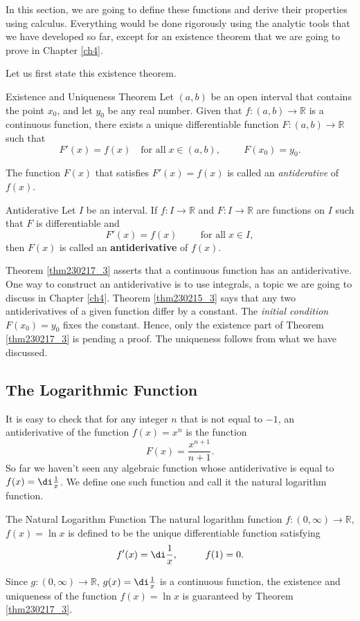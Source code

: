 In this section, we are going to define these functions  and derive their properties using calculus. Everything would be done rigorously using the analytic tools that we have developed so far, except for an existence theorem that we are going to prove in Chapter \ref{ch4}. 


Let us first state this existence theorem.
\begin{theorem}[label=thm230217_3]{Existence and Uniqueness Theorem}
Let $(a,b)$ be an open interval that contains the point $x_0$, and let $y_0$ be any real number.  Given that $f:(a,b)\to\mathbb{R}$ is a continuous function, there exists a unique differentiable function $F:(a,b)\to\mathbb{R}$ such that \[F'(x)=f(x)\quad \text{for all}\;x\in (a, b), \hspace{1cm}F(x_0)=y_0.\]
\end{theorem}
The function $F(x)$ that satisfies $F'(x)=f(x)$ is called an \emph{antiderative} of $f(x)$.
\begin{definition}{Antiderative}
Let $I$ be an interval. If $f:I\to\mathbb{R}$ and $F:I\to\mathbb{R}$ are functions on $I$ such that 
$F$ is differentiable and 
\[F'(x)=f(x)\hspace{1cm}\text{for all}\;x\in I,\]
then $F(x)$ is called an {\bf antiderivative} of $f(x)$.
\end{definition}
Theorem \ref{thm230217_3} asserts that  a continuous function has an antiderivative. One way to construct an antiderivative is to use integrals, a topic we are going to discuss in Chapter \ref{ch4}.   Theorem \ref{thm230215_3} says that any two  antiderivatives of a given function differ by a constant. The \emph{initial condition} $F(x_0)=y_0$ fixes the constant. Hence, only the existence part of Theorem \ref{thm230217_3} is pending a proof. The uniqueness follows from what we have discussed.

\subsection{The Logarithmic Function }
It is easy to check that for any integer $n$ that is not equal to $-1$, an antiderivative of the function $f(x)=x^n$ is the function
\[F(x)=\frac{x^{n+1}}{n+1}.\]
So far we haven't seen any algebraic function whose antiderivative is equal to $f(x)=\di\frac{1}{x}$.
We define one such function and call it the natural logarithm function.

\begin{definition}{The Natural Logarithm Function}
The natural logarithm function $f:(0, \infty)\to \mathbb{R}$, $f(x)=\ln x$ is defined to be the unique differentiable function satisfying
\[f'(x)=\di\frac{1}{x},\hspace{1cm}f(1)=0.\]
\end{definition}
Since $g:(0, \infty)\to \mathbb{R}$, $g(x)=\di\frac{1}{x}$ is a continuous function,
the existence and uniqueness of the function $f(x)=\ln x$ is guaranteed by Theorem \ref{thm230217_3}.

